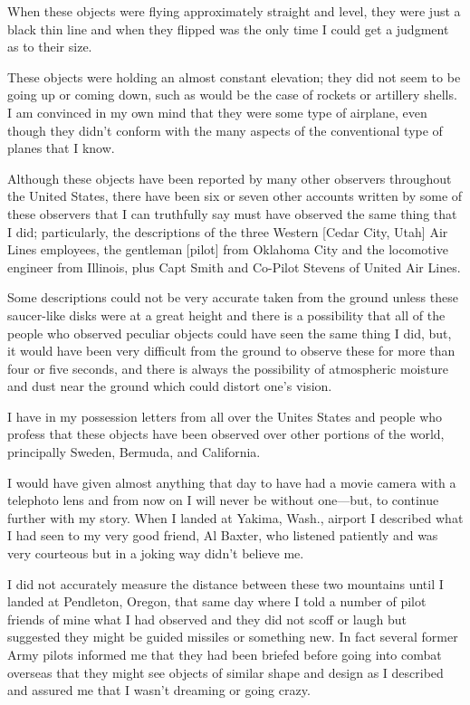 \begin{svgraybox}
      When these objects were flying approximately straight and level, they were just a black thin line and when they flipped was the only time I could get a judgment as to their size.

      These objects were holding an almost constant elevation; they did not seem to be going up or coming down, such as would be the case of rockets or artillery shells. I am convinced in my own mind that they were some type of airplane, even though they didn't conform with the many aspects of the conventional type of planes that I know.

      Although these objects have been reported by many other observers throughout the United States, there have been six or seven other accounts written by some of these observers that I can truthfully say must have observed the same thing that I did; particularly, the descriptions of the three Western [Cedar City, Utah] Air Lines employees, the gentleman [pilot] from Oklahoma City and the locomotive engineer from Illinois, plus Capt Smith and Co-Pilot Stevens of United Air Lines.

      Some descriptions could not be very accurate taken from the ground unless these saucer-like disks were at a great height and there is a possibility that all of the people who observed peculiar objects could have seen the same thing I did, but, it would have been very difficult from the ground to observe these for more than four or five seconds, and there is always the possibility of atmospheric moisture and dust near the ground which could distort one's vision.

      I have in my possession letters from all over the Unites States and people who profess that these objects have been observed over other portions of the world,
      principally Sweden, Bermuda, and California.

      I would have given almost anything that day to have had a movie camera with a telephoto lens and from now on I will never be without one---but, to continue further with my story. When I landed at Yakima, Wash., airport I described what I had seen to my very good friend, Al Baxter, who listened patiently and was very courteous but in a joking way didn't believe me.

      I did not accurately measure the distance between these two mountains until I landed at Pendleton, Oregon, that same day where I told a number of pilot friends of mine what I had observed and they did not scoff or laugh but suggested they might be guided missiles or something new. In fact several former Army pilots informed me that they had been briefed before going into combat overseas that they might see objects of similar shape and design as I described and assured me that I wasn't dreaming or going crazy.


\end{svgraybox}
